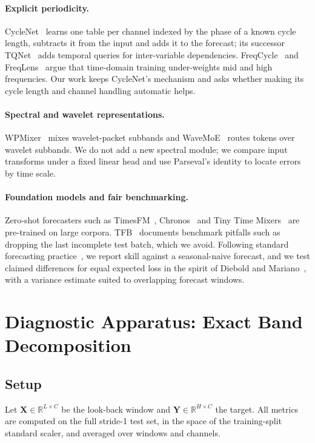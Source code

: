 \documentclass[11pt,a4paper]{article}
\begin{document}
\paragraph{Explicit periodicity.}
CycleNet~\cite{liu2024cyclenet} learns one table per channel indexed by the phase of a known cycle length, subtracts it from the input and adds it to the forecast; its successor TQNet~\cite{lin2025tqnet} adds temporal queries for inter-variable dependencies. FreqCycle~\cite{FreqCycle2026} and FreqLens~\cite{FreqLens2026} argue that time-domain training under-weights mid and high frequencies. Our work keeps CycleNet's mechanism and asks whether making its cycle length and channel handling automatic helps.

\paragraph{Spectral and wavelet representations.}
WPMixer~\cite{wpmixer2024} mixes wavelet-packet subbands and WaveMoE~\cite{WaveMoE2026} routes tokens over wavelet subbands. We do not add a new spectral module; we compare input transforms under a fixed linear head and use Parseval's identity to locate errors by time scale.

\paragraph{Foundation models and fair benchmarking.}
Zero-shot forecasters such as TimesFM~\cite{das2024timesfm}, Chronos~\cite{ansari2024chronos} and Tiny Time Mixers~\cite{ekambaram2024ttm} are pre-trained on large corpora. TFB~\cite{qiu2024tfb} documents benchmark pitfalls such as dropping the last incomplete test batch, which we avoid. Following standard forecasting practice~\cite{hyndman2021fpp3}, we report skill against a seasonal-naive forecast, and we test claimed differences for equal expected loss in the spirit of Diebold and Mariano~\cite{diebold1995comparing}, with a variance estimate suited to overlapping forecast windows.

\section{Diagnostic Apparatus: Exact Band Decomposition}
\label{sec:diagnostics}

\subsection{Setup}
Let $\mathbf{X}\in\mathbb{R}^{L\times C}$ be the look-back window and $\mathbf{Y}\in\mathbb{R}^{H\times C}$ the target. All metrics are computed on the full stride-1 test set, in the space of the training-split standard scaler, and averaged over windows and channels.
\end{document}
